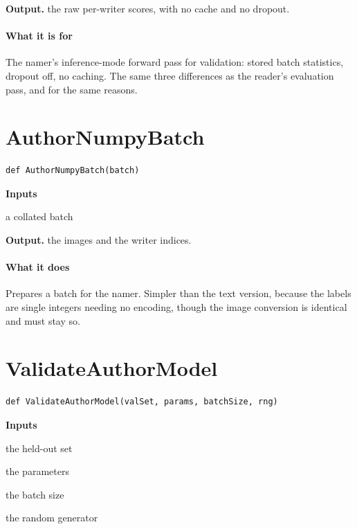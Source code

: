 \noindent\textbf{Output.} the raw per-writer scores, with no cache and no dropout.


\paragraph{What it is for}
The namer's inference-mode forward pass for validation: stored batch statistics, dropout off, no caching. The same three differences as the reader's evaluation pass, and for the same reasons.


\section{AuthorNumpyBatch}
\begin{lstlisting}[style=sig]
def AuthorNumpyBatch(batch)
\end{lstlisting}

\noindent\textbf{Inputs}
\begin{description}[leftmargin=2.2em,style=nextline,font=\normalfont\ttfamily]\setlength\itemsep{1pt}
  \item[{batch}] \normalfont a collated batch
\end{description}

\noindent\textbf{Output.} the images and the writer indices.


\paragraph{What it does}
Prepares a batch for the namer. Simpler than the text version, because the labels are single integers needing no encoding, though the image conversion is identical and must stay so.


\section{ValidateAuthorModel}
\begin{lstlisting}[style=sig]
def ValidateAuthorModel(valSet, params, batchSize, rng)
\end{lstlisting}

\noindent\textbf{Inputs}
\begin{description}[leftmargin=2.2em,style=nextline,font=\normalfont\ttfamily]\setlength\itemsep{1pt}
  \item[{valSet}] \normalfont the held-out set
  \item[{params}] \normalfont the parameters
  \item[{batchSize}] \normalfont the batch size
  \item[{rng}] \normalfont the random generator
\end{description}

